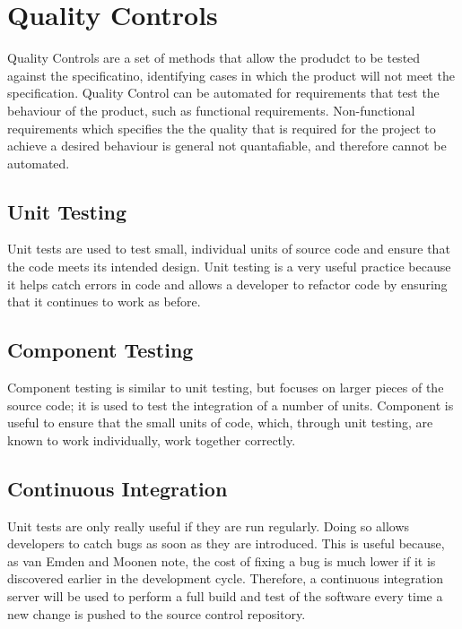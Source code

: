 \section{Quality Controls}
\label{section:quality}

Quality Controls are a set of methods that allow the produdct to be tested against the specificatino, identifying cases in which the product will not meet the specification.
Quality Control can be automated for requirements that test the behaviour of the product, such as functional requirements. Non-functional requirements which specifies the the quality that is required for the project to achieve a desired behaviour is general not quantafiable, and therefore cannot be automated.



% 

\subsection{Unit Testing}
Unit tests are used to test small, individual units of source code and ensure that the
code meets its intended design. Unit testing is a very useful practice because it helps
catch errors in code and allows a developer to refactor code by ensuring that it continues
to work as before.


\subsection{Component Testing}
Component testing is similar to unit testing, but focuses on larger pieces of the source
code; it is used to test the integration of a number of units. Component is useful to
ensure that the small units of code, which, through unit testing, are known to work
individually, work together correctly.

\subsection{Continuous Integration}
Unit tests are only really useful if they are run regularly. Doing so allows developers
to catch bugs as soon as they are introduced. This is useful because, as van Emden
and Moonen note, the cost of fixing a bug is much lower if it is discovered earlier in
the development cycle.\cite{emden2002} Therefore, a continuous integration server
will be used to perform a full build and test of the software every time a new change
is pushed to the source control repository.

